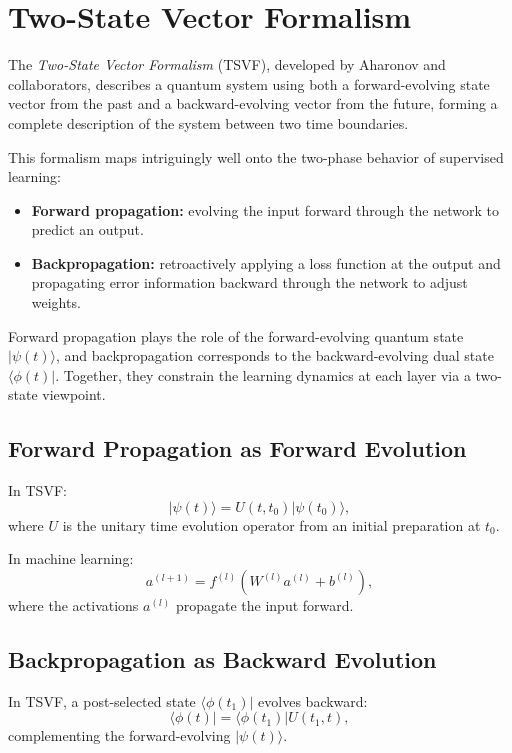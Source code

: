 \documentclass[../../../OAE-SPEC-MAIN.tex]{subfiles}
\begin{document}
\section{Two-State Vector Formalism}

The \emph{Two-State Vector Formalism} (TSVF), developed by Aharonov and collaborators, describes a quantum system using both a forward-evolving state vector from the past and a backward-evolving vector from the future, forming a complete description of the system between two time boundaries.

This formalism maps intriguingly well onto the two-phase behavior of supervised learning:

\begin{itemize}
  \item \textbf{Forward propagation:} evolving the input forward through the network to predict an output.
  \item \textbf{Backpropagation:} retroactively applying a loss function at the output and propagating error information backward through the network to adjust weights.
\end{itemize}

\begin{highlightbox}
Forward propagation plays the role of the forward-evolving quantum state \(|\psi(t)\rangle\), and backpropagation corresponds to the backward-evolving dual state \(\langle \phi(t)|\). Together, they constrain the learning dynamics at each layer via a two-state viewpoint.
\end{highlightbox}

\subsection{Forward Propagation as Forward Evolution}

In TSVF:
\[
|\psi(t)\rangle = U(t, t_0) |\psi(t_0)\rangle,
\]
where \(U\) is the unitary time evolution operator from an initial preparation at \(t_0\).

In machine learning:
\[
a^{(l+1)} = f^{(l)}(W^{(l)} a^{(l)} + b^{(l)}),
\]
where the activations \(a^{(l)}\) propagate the input forward.

\subsection{Backpropagation as Backward Evolution}

In TSVF, a post-selected state \(\langle\phi(t_1)|\) evolves backward:
\[
\langle \phi(t)| = \langle \phi(t_1)| U(t_1, t),
\]
complementing the forward-evolving \(|\psi(t)\rangle\).
\end{document}
